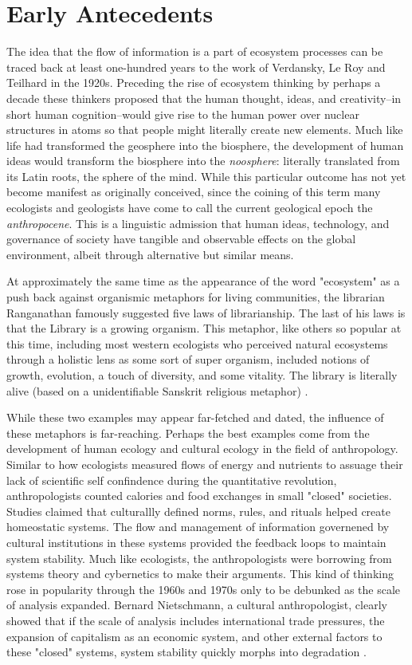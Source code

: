 \section{Early Antecedents}

The idea that the flow of information is a part of ecosystem processes can be traced back at least one-hundred years to the work of Verdansky, Le Roy and Teilhard in the 1920s. Preceding the rise of ecosystem thinking by perhaps a decade these thinkers proposed that the human thought, ideas, and creativity--in short human cognition--would give rise to the human power over nuclear structures in atoms so that people might literally create new elements. Much like life had transformed the geosphere into the biosphere, the development of human ideas would transform the biosphere into the \textit{noosphere}: literally translated from its Latin roots, the sphere of the mind. While this particular outcome has not yet become manifest as originally conceived, since the coining of this term many ecologists and geologists have come to call the current geological epoch the \textit{anthropocene}. This is a linguistic admission that human ideas, technology, and governance of society have tangible and observable effects on the global environment, albeit through alternative but similar means. 

At approximately the same time as the appearance of the word "ecosystem" as a push back against organismic metaphors for living communities, the librarian Ranganathan famously suggested five laws of librarianship. The last of his laws is that the Library is a growing organism. This metaphor, like others so popular at this time, including most western ecologists who perceived natural ecosystems through a holistic lens as some sort of super organism, included notions of growth, evolution, a touch of diversity, and some vitality. The library is literally alive (based on a unidentifiable Sanskrit religious metaphor) \citep{ranganathan_1931}.

While these two examples may appear far-fetched and dated, the influence of these metaphors is far-reaching. Perhaps the best examples come from the development of human ecology and cultural ecology in the field of anthropology. Similar to how ecologists measured flows of energy and nutrients to assuage their lack of scientific self confindence during the quantitative revolution, anthropologists counted calories and food exchanges in small "closed" societies. Studies claimed that culturallly defined norms, rules, and rituals helped create homeostatic systems. The flow and management of information governened by cultural institutions in these systems provided the feedback loops to maintain system stability. Much like ecologists, the anthropologists were borrowing from systems theory and cybernetics to make their arguments. This kind of thinking rose in popularity through the 1960s and 1970s only to be debunked as the scale of analysis expanded. Bernard Nietschmann, a cultural anthropologist, clearly showed that if the scale of analysis includes international trade pressures, the expansion of capitalism as an economic system, and other external factors to these "closed" systems, system stability quickly morphs into degradation \citep{nietschmannn_1973}.

